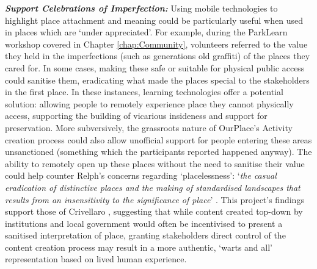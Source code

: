 \textbf{\textit{Support Celebrations of Imperfection:}} Using mobile technologies to highlight place attachment and meaning could be particularly useful when used in places which are `under appreciated'. For example, during the ParkLearn workshop covered in Chapter \ref{chap:Community}, volunteers referred to the value they held in the imperfections (such as generations old graffiti) of the places they cared for. In some cases, making these safe or suitable for physical public access could sanitise them, eradicating what made the places special to the stakeholders in the first place. In these instances, learning technologies offer a potential solution: allowing people to remotely experience place they cannot physically access, supporting the building of vicarious insideness and support for preservation. More subversively, the grassroots nature of OurPlace's Activity creation process could also allow unofficial support for people entering these areas unsanctioned (something which the participants reported happened anyway). The ability to remotely open up these places without the need to sanitise their value could help counter Relph's concerns regarding `placelessness': `\textit{the casual eradication of distinctive places and the making of standardised landscapes that results from an insensitivity to the significance of place}' \citep{Relph1976}. This project's findings support those of Crivellaro \citep{Crivellaro2016}, suggesting that while content created top-down by institutions and local government would often be incentivised to present a sanitised interpretation of place, granting stakeholders direct control of the content creation process may result in a more authentic, `warts and all' representation based on lived human experience.

